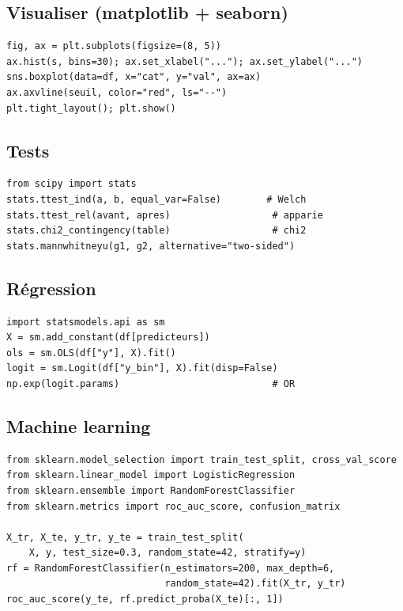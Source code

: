 \documentclass[11pt,a4paper]{article}
\begin{document}
\subsection*{Visualiser (matplotlib + seaborn)}
\begin{verbatim}
fig, ax = plt.subplots(figsize=(8, 5))
ax.hist(s, bins=30); ax.set_xlabel("..."); ax.set_ylabel("...")
sns.boxplot(data=df, x="cat", y="val", ax=ax)
ax.axvline(seuil, color="red", ls="--")
plt.tight_layout(); plt.show()
\end{verbatim}

\subsection*{Tests}
\begin{verbatim}
from scipy import stats
stats.ttest_ind(a, b, equal_var=False)        # Welch
stats.ttest_rel(avant, apres)                  # apparie
stats.chi2_contingency(table)                  # chi2
stats.mannwhitneyu(g1, g2, alternative="two-sided")
\end{verbatim}

\subsection*{R\'egression}
\begin{verbatim}
import statsmodels.api as sm
X = sm.add_constant(df[predicteurs])
ols = sm.OLS(df["y"], X).fit()
logit = sm.Logit(df["y_bin"], X).fit(disp=False)
np.exp(logit.params)                           # OR
\end{verbatim}

\subsection*{Machine learning}
\begin{verbatim}
from sklearn.model_selection import train_test_split, cross_val_score
from sklearn.linear_model import LogisticRegression
from sklearn.ensemble import RandomForestClassifier
from sklearn.metrics import roc_auc_score, confusion_matrix

X_tr, X_te, y_tr, y_te = train_test_split(
    X, y, test_size=0.3, random_state=42, stratify=y)
rf = RandomForestClassifier(n_estimators=200, max_depth=6,
                            random_state=42).fit(X_tr, y_tr)
roc_auc_score(y_te, rf.predict_proba(X_te)[:, 1])
\end{verbatim}

\newpage
\end{document}
